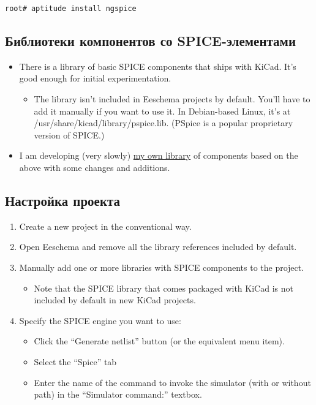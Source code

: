 \begin{verbatim}
root# aptitude install ngspice
\end{verbatim}

\subsection{Библиотеки компонентов со SPICE-элементами}

\begin{itemize}

\item There is a library of basic SPICE components that ships with KiCad. It's
good enough for initial experimentation.

\begin{itemize}
\item The library isn't included in Eeschema projects by default. You'll have to
add it manually if you want to use it.
In Debian-based Linux, it's at \\/usr/share/kicad/library/pspice.lib. (PSpice is
a popular proprietary version of SPICE.)
\end{itemize}

\item I am developing (very slowly)
\href{https://bitbucket.org/mithat/kicad-spice-library}{my own
library}
of components based on the above with some changes and additions.

\end{itemize}

\subsection{Настройка проекта}

\begin{enumerate}
\item Create a new project in the conventional way.
\item Open Eeschema and remove all the library references included by default.
\item Manually add one or more libraries with SPICE components to the project.
\begin{itemize}
  \item Note that the SPICE library that comes packaged with KiCad is not
  included by default in new KiCad projects.
\end{itemize}
\item Specify the SPICE engine you want to use:
\begin{itemize}
  \item Click the “Generate netlist” button (or the equivalent menu item).
  \item Select the “Spice” tab
  \item Enter the name of the command to invoke the simulator (with or without
path) in the “Simulator command:” textbox.
\end{itemize}
\end{enumerate}

